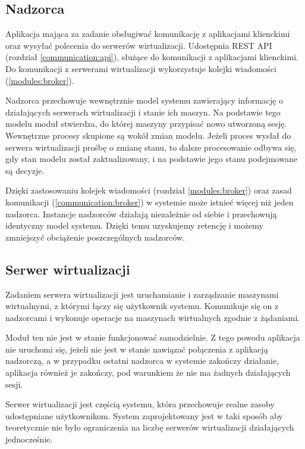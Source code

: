 \documentclass[../opis-rozwiazania.tex]{subfiles}
\begin{document}
\subsection{Nadzorca}
\label{modules:overseer}

Aplikacja mająca za zadanie obsługiwać komunikację z aplikacjami klienckimi oraz wysyłać polecenia do serwerów wirtualizacji. Udostępnia REST API (rozdział \ref{communication:api}), służące do komunikacji z aplikacjami klienckimi. Do komunikacji z serwerami wirtualizacji wykorzystuje kolejki wiadomości (\ref{modules:broker}).

Nadzorca przechowuje wewnętrznie model systemu zawierający informację o działających serwerach wirtualizacji i stanie ich maszyn. Na podstawie tego modelu moduł stwierdza, do której maszyny przypisać nowo utworzoną sesję. Wewnętrzne procesy skupione są wokół zmian modelu. Jeżeli proces wysłał do serwera wirtualizacji prośbę o zmianę stanu, to dalsze procesowanie odbywa się, gdy stan modelu został zaktualizowany, i na podstawie jego stanu podejmowane są decyzje.

Dzięki zastosowaniu kolejek wiadomości (rozdział \ref{modules:broker}) oraz zasad komunikacji (\ref{communication:broker}) w systemie może istnieć więcej niż jeden nadzorca. Instancje nadzorców działają niezależnie od siebie i przechowują identyczny model systemu. Dzięki temu uzyskujemy retencję i możemy zmniejszyć obciążenie poszczególnych nadzorców.

\subsection{Serwer wirtualizacji}
\label{modules:virtsrv}

Zadaniem serwera wirtualizacji jest uruchamianie i zarządzanie maszynami wirtualnymi, z którymi łączy się użytkownik systemu. Komunikuje się on z nadzorcami i wykonuje operacje na maszynach wirtualnych zgodnie z żądaniami.

Moduł ten nie jest w stanie funkcjonować samodzielnie. Z tego powodu aplikacja nie uruchomi się, jeżeli nie jest w stanie nawiązać połączenia z aplikacją nadzorczą, a w przypadku ostatni nadzorca w systemie zakończy działanie, aplikacja również je zakończy, pod warunkiem że nie ma żadnych działających sesji.

Serwer wirtualizacji jest częścią systemu, która przechowuje realne zasoby udostępniane użytkownikom.
System zaprojektowany jest w taki sposób aby teoretycznie nie było ograniczenia na liczbę serwerów wirtualizacji działających jednocześnie.
\end{document}
